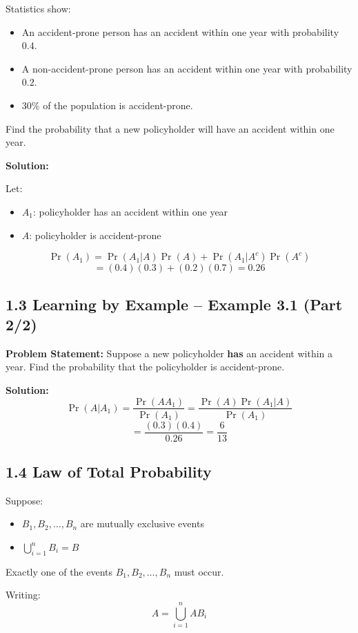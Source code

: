 \documentclass[12pt]{article}
\begin{document}
Statistics show:
\begin{itemize}
    \item An accident-prone person has an accident within one year with probability $0.4$.
    \item A non-accident-prone person has an accident within one year with probability $0.2$.
    \item $30\%$ of the population is accident-prone.
\end{itemize}

Find the probability that a new policyholder will have an accident within one year.

\textbf{Solution:}

Let:
\begin{itemize}
    \item $A_1$: policyholder has an accident within one year
    \item $A$: policyholder is accident-prone
\end{itemize}

\[
\Pr(A_1) = \Pr(A_1|A)\Pr(A) + \Pr(A_1|A^c)\Pr(A^c)
\]
\[
= (0.4)(0.3) + (0.2)(0.7) = 0.26
\]

\subsection*{1.3 Learning by Example – Example 3.1 (Part 2/2)}

\textbf{Problem Statement:}  
Suppose a new policyholder \textbf{has} an accident within a year.  
Find the probability that the policyholder is accident-prone.

\textbf{Solution:}
\[
\Pr(A|A_1) = \frac{\Pr(AA_1)}{\Pr(A_1)}
= \frac{\Pr(A)\Pr(A_1|A)}{\Pr(A_1)}
\]
\[
= \frac{(0.3)(0.4)}{0.26} = \frac{6}{13}
\]

\subsection*{1.4 Law of Total Probability}

Suppose:
\begin{itemize}
    \item $B_1, B_2, \ldots, B_n$ are mutually exclusive events
    \item $\bigcup_{i=1}^{n} B_i = B$
\end{itemize}

Exactly one of the events $B_1, B_2, \ldots, B_n$ must occur.

Writing:
\[
A = \bigcup_{i=1}^{n} AB_i
\]
\end{document}
